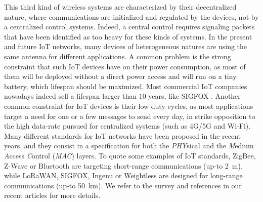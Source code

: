 This third kind of wireless systems are characterized by their decentralized nature,
where communications are initialized and regulated by the devices, not by a centralized control systems.
Indeed, a central control requires signaling packets that have been identified as too heavy for these kinds of systems.
In the present and future IoT networks, many devices of heterogeneous natures are using the same antenna for different applications.
A common problem is the strong constraint that such IoT devices have on their power consumption, as most of them will be deployed without a direct power access and will run on a tiny battery, which lifespan should be maximized.
Most commercial IoT companies nowadays indeed sell a lifespan larger than $10$ years, like SIGFOX \cite{Centenaro16}.
Another common constraint for IoT devices is their low duty cycles, as most applications target a need for one or a few messages to send every day, in strike opposition to the high data-rate pursued for centralized systems (such as 4G/5G and Wi-Fi).
%
Many different standards for IoT networks have been proposed in the recent years,
and they consist in a specification for both the \emph{PHY}sical
and the \emph{M}edium \emph{A}ccess \emph{C}ontrol (\emph{MAC}) layers.
To quote some examples of IoT standards, ZigBee, Z-Wave or Bluetooth are targeting short-range communications (up-to \SI{2}{\meter}), while LoRaWAN, SIGFOX, Ingenu or Weightless are designed for long-range communications (up-to \SI{50}{\kilo\meter}).
We refer to the survey \cite{Centenaro16} and references in our recent articles \cite{MoyBesson2019,MoyBesson2019Annales} for more details.



